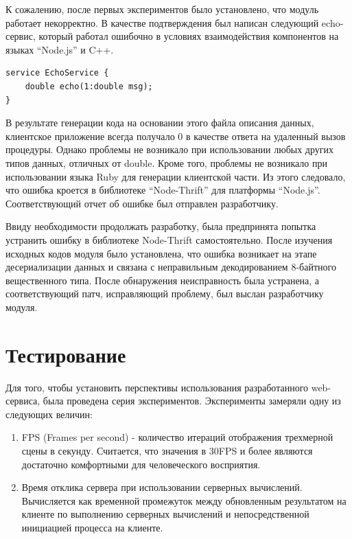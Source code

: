 \documentclass[14pt, a4paper]{extarticle}
\let\stdsection\section
\renewcommand\section{\newpage\stdsection}
\begin{document}
К сожалению, после первых экспериментов было установлено, что модуль работает
некорректно. В качестве подтверждения был написан следующий echo-сервис, который
работал ошибочно в условиях взаимодействия компонентов на языках ``Node.js'' и
C++.

\begin{lstlisting}
service EchoService {
    double echo(1:double msg);
}
\end{lstlisting}

В результате генерации кода на основании этого файла описания данных,
клиентское приложение всегда получало 0 в качестве ответа на удаленный
вызов процедуры. Однако проблемы не возникало при использовании любых других
типов данных, отличных от double. Кроме того, проблемы не возникало при
использовании языка Ruby для генерации клиентской части. Из этого следовало, что
ошибка кроется в библиотеке ``Node-Thrift'' для платформы ``Node.js''.
Соответствующий отчет об ошибке был отправлен разработчику.

Ввиду необходимости продолжать разработку, была предпринята попытка устранить
ошибку в библиотеке Node-Thrift самостоятельно. После изучения исходных
кодов модуля было установлена, что ошибка возникает на этапе десериализации
данных и связана с неправильным декодированием 8-байтного вещественного типа.
После обнаружения неисправность была устранена, а соответствующий
патч\cite{nodethriftpatch},
исправляющий проблему, был выслан разработчику модуля.

\section{Тестирование}

Для того, чтобы установить перспективы использования разработанного web-сервиса,
была проведена серия экспериментов. Эксперименты замеряли одну из следующих
величин:
\begin{enumerate}
    \item FPS (Frames per second) - количество итераций отображения
    трехмерной сцены в секунду. Считается, что значения в 30FPS и более являются
    достаточно комфортными для человеческого восприятия.
    \item Время отклика сервера при использовании серверных
    вычислений. Вычисляется как временной промежуток между обновленным
    результатом на клиенте по выполнению серверных вычислений и непосредственной
    инициацией процесса на клиенте.
\end{enumerate}
\end{document}
